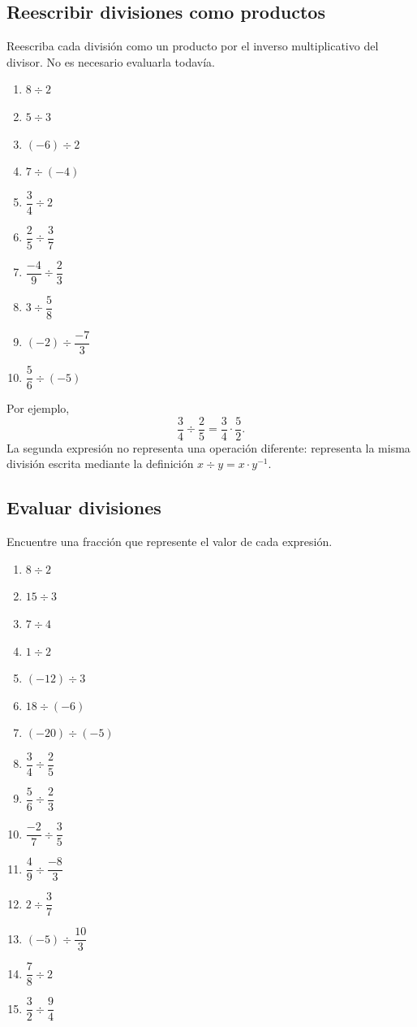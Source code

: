 \subsection*{Reescribir divisiones como productos}

Reescriba cada división como un producto por el inverso multiplicativo del divisor. No es necesario evaluarla todavía.

\begin{enumerate}
\item \(8\div2\)
\item \(5\div3\)
\item \((-6)\div2\)
\item \(7\div(-4)\)
\item \(\dfrac34\div2\)
\item \(\dfrac25\div\dfrac37\)
\item \(\dfrac{-4}{9}\div\dfrac23\)
\item \(3\div\dfrac58\)
\item \((-2)\div\dfrac{-7}{3}\)
\item \(\dfrac56\div(-5)\)
\end{enumerate}

Por ejemplo,
\[
\frac34\div\frac25
=
\frac34\cdot\frac52.
\]
La segunda expresión no representa una operación diferente: representa la misma división escrita mediante la definición \(x\div y=x\cdot y^{-1}\).

\subsection*{Evaluar divisiones}

Encuentre una fracción que represente el valor de cada expresión.

\begin{enumerate}
\item \(8\div2\)
\item \(15\div3\)
\item \(7\div4\)
\item \(1\div2\)
\item \((-12)\div3\)
\item \(18\div(-6)\)
\item \((-20)\div(-5)\)
\item \(\dfrac34\div\dfrac25\)
\item \(\dfrac56\div\dfrac23\)
\item \(\dfrac{-2}{7}\div\dfrac35\)
\item \(\dfrac49\div\dfrac{-8}{3}\)
\item \(2\div\dfrac37\)
\item \((-5)\div\dfrac{10}{3}\)
\item \(\dfrac78\div2\)
\item \(\dfrac32\div\dfrac94\)
\end{enumerate}

